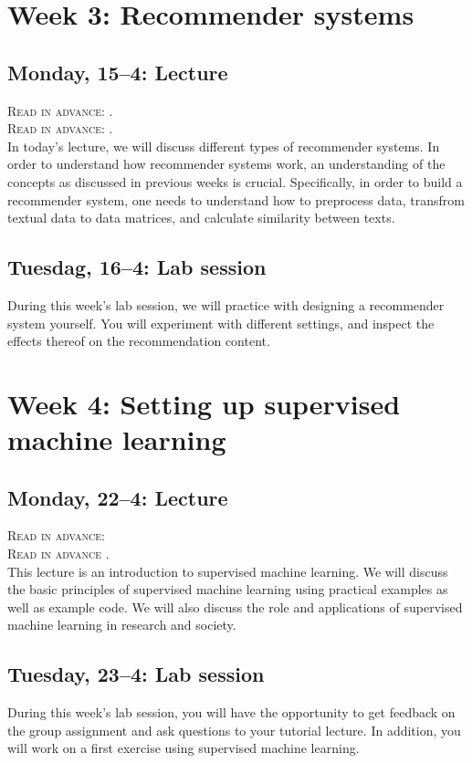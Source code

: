 \section*{Week 3: Recommender systems}

\subsection*{Monday, 15--4: Lecture}
\textsc{ Read in advance: \cite{Moller2018}.}\\
\textsc{ Read in advance: \cite{Loecherbach2020}.}\\

In today's lecture, we will discuss different types of recommender systems. In order to understand how recommender systems work, an understanding of the concepts as discussed in previous weeks is crucial. Specifically, in order to build a recommender system, one needs to understand how to preprocess data, transfrom textual data to data matrices, and calculate similarity between texts. 

\subsection*{Tuesdag, 16--4: Lab session}
During this week's lab session, we will practice with designing a recommender system yourself. You will experiment with different settings, and inspect the effects thereof on the recommendation content. 

\section*{Week 4: Setting up supervised machine learning}

\subsection*{Monday, 22--4: Lecture}
\textsc{ Read in advance: \cite{vermeer_seeing_2019}}\\
\textsc{ Read in advance \cite{meppelink_reliable_2021}.}\\

This lecture is an introduction to supervised machine learning. We will discuss the basic principles of supervised machine learning using practical examples as well as example code. We will also discuss the role and applications of supervised machine learning in research and society.

\subsection*{Tuesday, 23--4: Lab session}
During this week's lab session, you will have the opportunity to get feedback on the group assignment and ask questions to your tutorial lecture. In addition, you will work on a first exercise using supervised machine learning.

